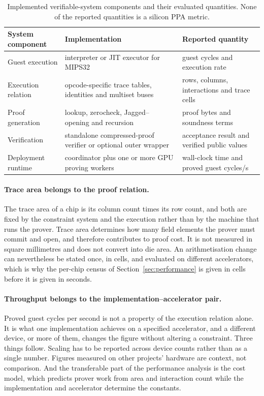 \begin{table}[t]
\centering
\small
\caption{Implemented verifiable-system components and their evaluated quantities. None of the reported quantities is a silicon PPA metric.}
\label{tab:design-correspondence}
\begin{tabular}{>{\raggedright\arraybackslash}p{} >{\raggedright\arraybackslash}p{} >{\raggedright\arraybackslash}p{}}
\toprule
System component & Implementation & Reported quantity \\
\midrule
Guest execution & interpreter or JIT executor for MIPS32 & guest cycles and execution rate \\
Execution relation & opcode-specific trace tables, identities and multiset buses & rows, columns, interactions and trace cells \\
Proof generation & lookup, zerocheck, Jagged--\WHIR{} opening and recursion & proof bytes and soundness terms \\
Verification & standalone compressed-proof verifier or optional outer wrapper & acceptance result and verified public values \\
Deployment runtime & coordinator plus one or more GPU proving workers & wall-clock time and proved guest cycles/s \\
\bottomrule
\end{tabular}
\end{table}

\paragraph{Trace area belongs to the proof relation.}\label{sec:ipcore-platform} The trace area of a chip is its column count times its row count, and both are fixed by the constraint system and the execution rather than by the machine that runs the prover. Trace area determines how many field elements the prover must commit and open, and therefore contributes to proof cost. It is not measured in square millimetres and does not convert into die area. An arithmetisation change can nevertheless be stated once, in cells, and evaluated on different accelerators, which is why the per-chip census of Section~\ref{sec:performance} is given in cells before it is given in seconds.

\paragraph{Throughput belongs to the implementation--accelerator pair.} Proved guest cycles per second is not a property of the execution relation alone. It is what one implementation achieves on a specified accelerator, and a different device, or more of them, changes the figure without altering a constraint. Three things follow. Scaling has to be reported across device counts rather than as a single number. Figures measured on other projects' hardware are context, not comparison. And the transferable part of the performance analysis is the cost model, which predicts prover work from area and interaction count while the implementation and accelerator determine the constants.

